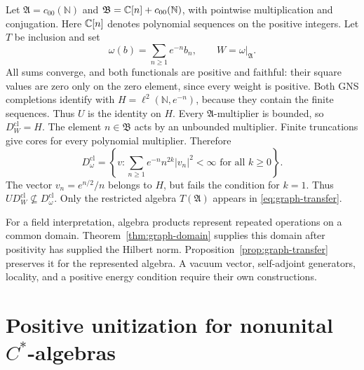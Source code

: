 \begin{example}
Let\label{ex:transfer-domain} $\mathfrak A=c_{00}(\mathbb N)$ and
$\mathfrak B=\mathbb C[n]+c_{00}(\mathbb N)$, with pointwise multiplication
and conjugation.  Here $\mathbb C[n]$ denotes polynomial sequences on the
positive integers.  Let $T$ be inclusion and set
\[
 \omega(b)=\sum_{n\geq1}e^{-n}b_n,
 \qquad W=\omega|_{\mathfrak A}.
\]
All sums converge, and both functionals are positive and faithful: their
square values are zero only on the zero element, since every weight is positive.
Both GNS completions identify with
$H=\ell^2(\mathbb N,e^{-n})$, because they contain the finite sequences.
Thus $U$ is the identity on $H$.
Every $\mathfrak A$-multiplier is bounded, so $D_W^{\mathrm{cl}}=H$.
The element $n\in\mathfrak B$ acts by an unbounded multiplier.
Finite truncations give cores for every polynomial multiplier.  Therefore
\[
 D_\omega^{\mathrm{cl}}
 =\left\{v:\sum_{n\geq1}e^{-n}n^{2k}|v_n|^2<\infty
               \text{ for all }k\geq0\right\}.
\]
The vector $v_n=e^{n/2}/n$ belongs to $H$, but fails the condition for
$k=1$.  Thus $U D_W^{\mathrm{cl}}\nsubseteq D_\omega^{\mathrm{cl}}$.
Only the restricted algebra $T(\mathfrak A)$ appears in
\eqref{eq:graph-transfer}.
\end{example}

For a field interpretation, algebra products represent repeated operations
on a common domain.  Theorem~\ref{thm:graph-domain} supplies this domain
after positivity has supplied the Hilbert norm.
Proposition~\ref{prop:graph-transfer} preserves it for the represented
algebra.  A vacuum vector, self-adjoint generators, locality, and a positive
energy condition require their own constructions.

\section{Positive unitization for nonunital
\texorpdfstring{$C^*$}{C-star}-algebras}

